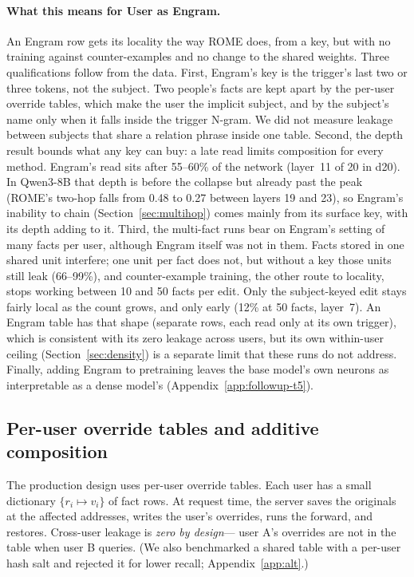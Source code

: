 \documentclass[11pt]{article}
\begin{document}
\paragraph{What this means for User as Engram.} An Engram row gets its
locality the way ROME does, from a key, but with no training against
counter-examples and no change to the shared weights. Three qualifications
follow from the data. First, Engram's key is the trigger's last two or
three tokens, not the subject. Two people's facts are kept apart by the
per-user override tables, which make the user the implicit subject,
and by the subject's name only when it falls inside the trigger
N-gram. We did not measure leakage between subjects that share a
relation phrase inside one table. Second, the depth result bounds what
any key can buy: a late read limits composition for every method.
Engram's read sits after 55--60\% of the network (layer~11 of 20 in
d20). In Qwen3-8B that depth is before the collapse but already past
the peak (ROME's two-hop falls from 0.48 to 0.27 between layers 19
and 23), so Engram's inability to chain (Section~\ref{sec:multihop})
comes mainly from its surface key, with its depth adding to it. Third,
the multi-fact runs bear on Engram's setting of many facts per user,
although Engram itself was not in them. Facts stored in one shared
unit interfere; one unit per fact does not, but without a key those
units still leak (66--99\%), and counter-example training, the
other route to locality, stops working between 10 and 50 facts per
edit. Only the subject-keyed edit stays fairly local as the count
grows, and only early (12\% at 50 facts, layer~7). An
Engram table has that shape (separate rows, each read only at its own
trigger), which is consistent with its zero leakage across users, but
its own within-user ceiling (Section~\ref{sec:density}) is a separate
limit that these runs do not address. Finally, adding Engram to pretraining
leaves the base model's own neurons as interpretable as a dense
model's (Appendix~\ref{app:followup-t5}).

\subsection{Per-user override tables and additive composition}

The production design uses per-user override tables. Each user
has a small dictionary $\{r_i \mapsto v_i\}$ of fact rows. At
request time, the server saves the originals at the affected
addresses, writes the user's overrides, runs the forward, and
restores. Cross-user leakage is \emph{zero by design}---%
user A's overrides are not in the table when user B queries. (We
also benchmarked a shared table with a per-user hash salt and
rejected it for lower recall; Appendix~\ref{app:alt}.)
\end{document}
